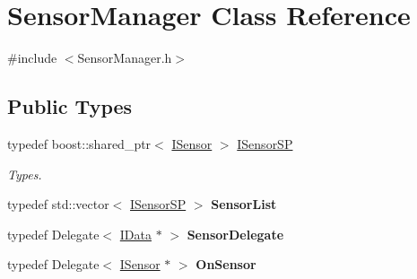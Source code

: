 \hypertarget{class_sensor_manager}{}\section{Sensor\+Manager Class Reference}
\label{class_sensor_manager}


{\ttfamily \#include $<$Sensor\+Manager.\+h$>$}

\subsection*{Public Types}
\begin{DoxyCompactItemize}
\item 
\mbox{\label{class_sensor_manager_a5cd8f6f5dfe0ccc8875ed536ae5df51e}} 
typedef boost\+::shared\+\_\+ptr$<$ \hyperlink{class_i_sensor}{I\+Sensor} $>$ \hyperlink{class_sensor_manager_a5cd8f6f5dfe0ccc8875ed536ae5df51e}{I\+Sensor\+SP}
\begin{DoxyCompactList}\small\item\em Types. \end{DoxyCompactList}\item 
\mbox{\label{class_sensor_manager_af5afe695338cdece05eb03f94424dbb4}} 
typedef std\+::vector$<$ \hyperlink{class_sensor_manager_a5cd8f6f5dfe0ccc8875ed536ae5df51e}{I\+Sensor\+SP} $>$ {\bfseries Sensor\+List}
\item 
\mbox{\label{class_sensor_manager_a5fcebad14f399f3b3d37a85d053f0039}} 
typedef Delegate$<$ \hyperlink{class_i_data}{I\+Data} $\ast$ $>$ {\bfseries Sensor\+Delegate}
\item 
\mbox{\label{class_sensor_manager_a243d2b54e3115be1f15254e6d66ec9cd}} 
typedef Delegate$<$ \hyperlink{class_i_sensor}{I\+Sensor} $\ast$ $>$ {\bfseries On\+Sensor}
\end{DoxyCompactItemize}

